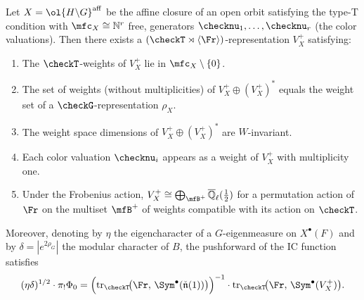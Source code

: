 \begin{theorem}
  Let \( X = \ol{H \backslash G}^{\mathrm{aff}} \) be the affine closure of an open orbit
  satisfying the type-T condition with \( \mfc_X \cong \mathbb{N}^r \) free, generators
  \( \checknu_1, \ldots, \checknu_r \) (the color valuations).
  Then there exists a \( (\checkT \rtimes \langle \Fr \rangle) \)-representation
  \( V_X^+ \) satisfying:
  \begin{enumerate}
    \item The \( \checkT \)-weights of \( V_X^+ \) lie in \( \mfc_X \setminus \{0\} \).
    \item The set of weights (without multiplicities) of \( V_X^+ \oplus (V_X^+)^* \)
          equals the weight set of a \( \checkG \)-representation \( \rho_X \).
    \item The weight space dimensions of \( V_X^+ \oplus (V_X^+)^* \) are
          \( W \)-invariant.
    \item Each color valuation \( \checknu_i \) appears as a weight of \( V_X^+ \)
          with multiplicity one.
    \item Under the Frobenius action,
          \( V_X^+ \cong \bigoplus_{\mfB^+} \overline{\mathbb{Q}}_\ell(\tfrac{1}{2}) \)
          for a permutation action of \( \Fr \) on the multiset \( \mfB^+ \) of weights
          compatible with its action on \( \checkT \).
  \end{enumerate}
  Moreover, denoting by \( \eta \) the eigencharacter of a \( G \)-eigenmeasure on
  \( X^\bullet(F) \) and by \( \delta = |e^{2\rho_G}| \) the modular character of \( B \),
  the pushforward of the IC function satisfies
  \[
    (\eta\delta)^{1/2} \cdot \pi_! \Phi_0
    = \Bigl(\mathrm{tr}_{\checkT}\!\bigl(\Fr,\, \Sym^\bullet(\check{\mathfrak{n}}(1))\bigr)
      \Bigr)^{-1}
      \cdot \mathrm{tr}_{\checkT}\!\bigl(\Fr,\, \Sym^\bullet(V_X^+)\bigr).
  \]
\end{theorem}

